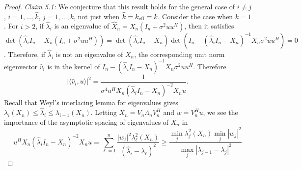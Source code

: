 \begin{proof}
\textit{Claim 5.1:}  We conjecture that this result holds for the general case of $i\neq
j$, $i=1,\dots,\widehat{k}$, $j=1,\dots,k$, not just when $\widehat{k}=k_\text{eff}=k$. Consider
the case when $k=1$. For $i>2$, if $\widehat{\lambda}_i$ is an eigenvalue of
$\widehat{X}_n=X_n(I_n+\sigma^2uu^H)$, then it satisfies
$\det(\widehat{\lambda}_iI_n-X_n(I_n+\sigma^2uu^H)) =
\det(\widehat{\lambda}_iI_n-X_n)\det(I_n-(\widehat{\lambda}_iI_n-X_n)^{-1}X_n\sigma^2uu^H)=0$. Therefore,
if $\widehat{\lambda}_i$ is not an eigenvalue of $X_n$, the corresponding unit norm
eigenvector $\widehat{v}_i$ is in the kernel of
$I_n-(\widehat{\lambda}_iI_n-X_n)^{-1}X_n\sigma^2uu^H$. Therefore
\begin{equation*}
  |\langle \widehat{v}_i,u\rangle |^2 = \frac{1}{\sigma^4u^HX_n\left(\widehat{\lambda}_iI_n-X_n\right)^{-2}X_nu}.
\end{equation*}
Recall that Weyl's interlacing lemma for eigenvalues gives $\lambda_i(X_n)\leq
\widehat{\lambda}_i\leq \lambda_{i-1}(X_n)$. Letting $X_n=V_n\Lambda_nV_n^H$ and
$w=V_n^Hu$, we see the importance of the
asymptotic spacing of eigenvalues of $X_n$ in
\begin{equation*}
  u^HX_n(\widehat{\lambda}_iI_n-X_n)^{-2}X_nu
  =\sum_{\ell=1}^n\frac{|w_\ell|^2\lambda_\ell^2(X_n)}{\left(\widehat{\lambda}_i-\lambda_\ell\right)^2}\geq
  \frac{\min_j\lambda_j^2(X_n)\min_j|w_j|^2}{\max_j |\lambda_{j-1}-\lambda_j|^2}
\end{equation*}


\end{proof}
